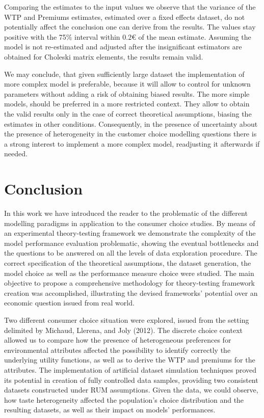 \documentclass[12pt,]{article}
\begin{document}
Comparing the estimates to the input values we observe that the variance
of the WTP and Premiums estimates, estimated over a fixed effects
dataset, do not potentially affect the conclusion one can derive from
the results. The values stay positive with the 75\% interval within 0.2€
of the mean estimate. Assuming the model is not re-estimated and
adjusted after the insignificant estimators are obtained for Choleski
matrix elements, the results remain valid.

We may conclude, that given sufficiently large dataset the
implementation of more complex model is preferable, because it will
allow to control for unknown parameters without adding a risk of
obtaining biased results. The more simple models, should be preferred in
a more restricted context. They allow to obtain the valid results only
in the case of correct theoretical assumptions, biasing the estimates in
other conditions. Consequently, in the presence of uncertainty about the
presence of heterogeneity in the customer choice modelling questions
there is a strong interest to implement a more complex model,
readjusting it afterwards if needed.

\FloatBarrier

\FloatBarrier

\newpage

\hypertarget{conclusion}{%
\section*{Conclusion}\label{conclusion}}

In this work we have introduced the reader to the problematic of the
different modelling paradigms in application to the consumer choice
studies. By means of an experimental theory-testing framework we
demonstrate the complexity of the model performance evaluation
problematic, showing the eventual bottlenecks and the questions to be
answered on all the levels of data exploration procedure. The correct
specification of the theoretical assumptions, the dataset generation,
the model choice as well as the performance measure choice were studied.
The main objective to propose a comprehensive methodology for
theory-testing framework creation was accomplished, illustrating the
devised frameworks' potential over an economic question issued from real
world.

Two different consumer choice situation were explored, issued from the
setting delimited by Michaud, Llerena, and Joly (2012). The discrete
choice context allowed us to compare how the presence of heterogeneous
preferences for environmental attributes affected the possibility to
identify correctly the underlying utility functions, as well as to
derive the WTP and premiums for the attributes. The implementation of
artificial dataset simulation techniques proved its potential in
creation of fully controlled data samples, providing two consistent
datasets constructed under RUM assumptions. Given the data, we could
observe, how taste heterogeneity affected the population's choice
distribution and the resulting datasets, as well as their impact on
models' performances.
\end{document}
